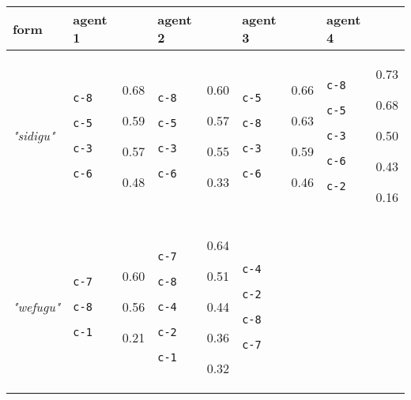 
{\footnotesize\renewcommand{\arraystretch}{1.5}
\begin{tabular}{@{}p{1.2cm}|p{1.3cm}@{}p{0.8cm}@{}|p{1.3cm}@{}p{0.8cm}@{}|p{1.3cm}@{}p{0.8cm}@{}|p{1.3cm}@{}p{0.8cm}@{}}
form & agent 1 &  & agent 2 &  & agent 3 &  & agent 4 & \\
\hline
\textit{"sidigu"} & \texttt{c-8}

\texttt{c-5}

\texttt{c-3}

\texttt{c-6} & 0.68

0.59

0.57

0.48 & \texttt{c-8}

\texttt{c-5}

\texttt{c-3}

\texttt{c-6} & 0.60

0.57

0.55

0.33 & \texttt{c-5}

\texttt{c-8}

\texttt{c-3}

\texttt{c-6} & 0.66

0.63

0.59

0.46 & \texttt{c-8}

\texttt{c-5}

\texttt{c-3}

\texttt{c-6}

\texttt{c-2} & 0.73

0.68

0.50

0.43

0.16\\
\hline
\textit{"wefugu"} & \texttt{c-7}

\texttt{c-8}

\texttt{c-1} & 0.60

0.56

0.21 & \texttt{c-7}

\texttt{c-8}

\texttt{c-4}

\texttt{c-2}

\texttt{c-1} & 0.64

0.51

0.44

0.36

0.32 & \texttt{c-4}

\texttt{c-2}

\texttt{c-8}

\texttt{c-7}


\end{tabular}}

